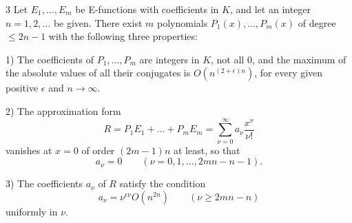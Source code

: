 \begin{mylemma}{}{3}
Let $E_1, \dots, E_m$ be E-functions with coefficients in $K$, and let an integer $n=1,2,\dots$ be given. There exist $m$ polynomials $P_1(x), \dots, P_m(x)$ of degree $\le 2n-1$ with the following three properties:

1) The coefficients of $P_1, \dots, P_m$ are integers in $K$, not all 0, and the maximum of the absolute values of all their conjugates is $O(n^{(2+\epsilon)n})$, for every given positive $\epsilon$ and $n \to \infty$.

2) The approximation form
\begin{equation}
R = P_1 E_1 + \dots + P_m E_m = \sum_{\nu=0}^{\infty} a_{\nu} \frac{x^{\nu}}{\nu!} \tag{54}\label{eq:54}
\end{equation}
vanishes at $x=0$ of order $(2m-1)n$ at least, so that
\begin{equation}
a_{\nu} = 0 \qquad (\nu = 0, 1, \dots, 2mn-n-1). \tag{55}\label{eq:55}
\end{equation}

3) The coefficients $a_{\nu}$ of $R$ satisfy the condition
\[a_{\nu} = \nu^{\epsilon \nu} O(n^{2n}) \qquad (\nu \ge 2mn-n)\]
uniformly in $\nu$.
\end{mylemma}

